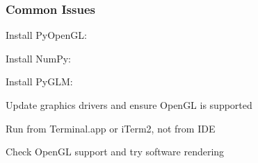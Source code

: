 \documentclass[a4paper,10pt,english,openany,oneside]{sphinxmanual}
\begin{document}
\subsubsection{Common Issues}
\label{\detokenize{installation:common-issues}}\begin{description}
\sphinxAtStartPar
Install PyOpenGL: 

\sphinxAtStartPar
Install NumPy: 

\sphinxAtStartPar
Install PyGLM: 

\sphinxAtStartPar
Update graphics drivers and ensure OpenGL is supported

\sphinxAtStartPar
Run from Terminal.app or iTerm2, not from IDE

\sphinxAtStartPar
Check OpenGL support and try software rendering

\end{description}
\end{document}
